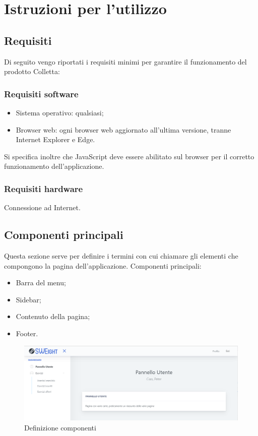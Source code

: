 \section{Istruzioni per l'utilizzo}
\subsection{Requisiti}
Di seguito vengo riportati i requisiti minimi per garantire il funzionamento del prodotto Colletta:
\subsubsection{Requisiti software}
\begin{itemize}
\item {Sistema operativo:} qualsiasi;
\item {Browser web:} ogni browser web aggiornato all'ultima versione, tranne Internet Explorer e Edge.
\end{itemize}
Si specifica inoltre che JavaScript deve essere abilitato sul browser per il corretto funzionamento dell’applicazione.
\subsubsection{Requisiti hardware}
Connessione ad Internet.
\subsection{Componenti principali}
Questa sezione serve per definire i termini con cui chiamare gli elementi che compongono la pagina dell'applicazione.
Componenti principali:
\begin{itemize}
    \item Barra del menu;
    \item {Sidebar};
    \item Contenuto della pagina;
    \item Footer.
\end{itemize}

\begin{figure}[H]
    \centering
    \includegraphics[width=17cm]{sez/img/istruzioni/dashboard.png} 
    \caption{Definizione componenti}\label{fig:1}
\end{figure}

